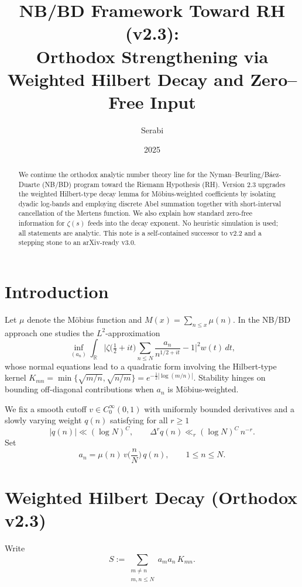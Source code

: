 \documentclass[11pt]{article}
\title{NB/BD Framework Toward RH (v2.3):\\
Orthodox Strengthening via Weighted Hilbert Decay and Zero--Free Input}
\author{Serabi}
\date{2025}
\theoremstyle{remark}
\begin{document}
\maketitle

\begin{abstract}
We continue the orthodox analytic number theory line for the Nyman--Beurling/B\'aez-Duarte (NB/BD) program toward the Riemann Hypothesis (RH).
Version 2.3 upgrades the weighted Hilbert-type decay lemma for M\"obius-weighted coefficients by isolating dyadic log-bands and employing discrete Abel summation together with short-interval cancellation of the Mertens function.
We also explain how standard zero-free information for $\zeta(s)$ feeds into the decay exponent.
No heuristic simulation is used; all statements are analytic.
This note is a self-contained successor to v2.2 and a stepping stone to an arXiv-ready v3.0.
\end{abstract}

\section{Introduction}
Let $\mu$ denote the M\"obius function and $M(x)=\sum_{n\le x}\mu(n)$.
In the NB/BD approach one studies the $L^2$-approximation
\begin{equation}\label{eq:NBBDgoal}
\inf_{(a_n)} \int_{\mathbb{R}} \Big|\zeta\!\big(\tfrac12+it\big)\sum_{n\le N}\frac{a_n}{n^{1/2+it}}-1\Big|^2 w(t)\,dt,
\end{equation}
whose normal equations lead to a quadratic form involving the Hilbert-type kernel
$K_{mn}=\min\{\sqrt{m/n},\sqrt{n/m}\}=e^{-\frac12|\log(m/n)|}$.
Stability hinges on bounding off-diagonal contributions when $a_n$ is M\"obius-weighted.

We fix a smooth cutoff $v\in C_0^\infty(0,1)$ with uniformly bounded derivatives and a slowly varying weight $q(n)$ satisfying for all $r\ge 1$
\begin{equation}\label{eq:qdiff}
|q(n)|\ll (\log N)^C,\qquad \Delta^r q(n)\ll_r (\log N)^C\, n^{-r}.
\end{equation}
Set
\begin{equation}\label{eq:an}
a_n=\mu(n)\,v\!\Big(\frac{n}{N}\Big)\,q(n),\qquad 1\le n\le N.
\end{equation}

\section{Weighted Hilbert Decay (Orthodox v2.3)}
Write
\begin{equation}\label{eq:S}
S:=\sum_{\substack{m\ne n\\ m,n\le N}} a_m a_n\,K_{mn}.
\end{equation}
\end{document}
